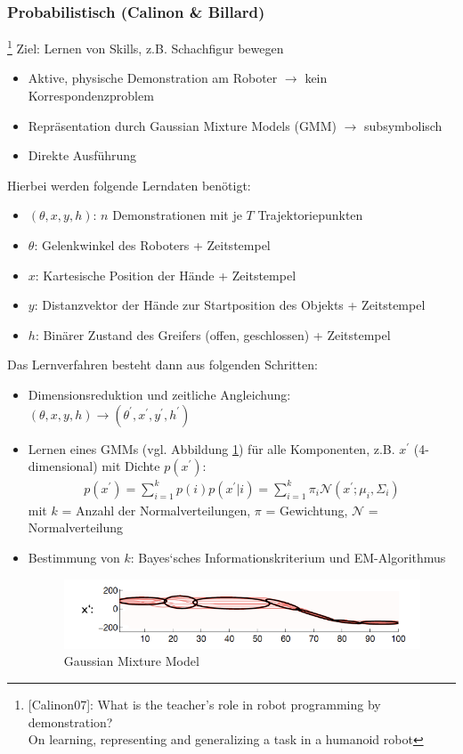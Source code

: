 \subsubsection*{Probabilistisch (Calinon \& Billard)}\footnote{[Calinon07]: What is the teacher’s role in robot programming by demonstration?\\
On learning, representing and generalizing a task in a humanoid robot}
Ziel: Lernen von Skills, z.B. Schachfigur bewegen
\begin{itemize}
\item Aktive, physische Demonstration am Roboter $\rightarrow$ kein Korrespondenzproblem
\item Repräsentation durch Gaussian Mixture Models (GMM) $\rightarrow$ subsymbolisch
\item Direkte Ausführung
\end{itemize}
Hierbei werden folgende Lerndaten benötigt:
\begin{itemize}
\item $(\theta, x, y, h)$: $n$ Demonstrationen mit je $T$ Trajektoriepunkten
\item $\theta$: Gelenkwinkel des Roboters + Zeitstempel
\item $x$: Kartesische Position der Hände + Zeitstempel
\item $y$: Distanzvektor der Hände zur Startposition des Objekts + Zeitstempel
\item $h$: Binärer Zustand des Greifers (offen, geschlossen) + Zeitstempel
\end{itemize}
Das Lernverfahren besteht dann aus folgenden Schritten: 
\begin{itemize}
\item Dimensionsreduktion und zeitliche Angleichung: $(\theta, x, y, h) \rightarrow (\theta^\prime, x^\prime, y^\prime, h^\prime)$
\item Lernen eines GMMs (vgl. Abbildung \ref{fig:ch03_gmm}) für alle Komponenten, z.B. $x^\prime$ (4-dimensional) mit Dichte $p(x^\prime)$:
\begin{align*}
p(x^\prime) = \sum\limits_{i=1}^k p(i)p(x^\prime|i) = \sum\limits_{i=1}^k \pi_i \mathcal{N}(x^\prime; \mu_i, \Sigma_i)
\end{align*} mit $k$ = Anzahl der Normalverteilungen, $\pi$ = Gewichtung, $\mathcal{N}$ = Normalverteilung
\item Bestimmung von $k$: Bayes‘sches Informationskriterium und EM-Algorithmus
\begin{figure}[ht]\centering 
\includegraphics[width=0.6\linewidth]{figures/ch03_gmm.png}
\caption{Gaussian Mixture Model}
\label{fig:ch03_gmm}
\end{figure}
\end{itemize}
